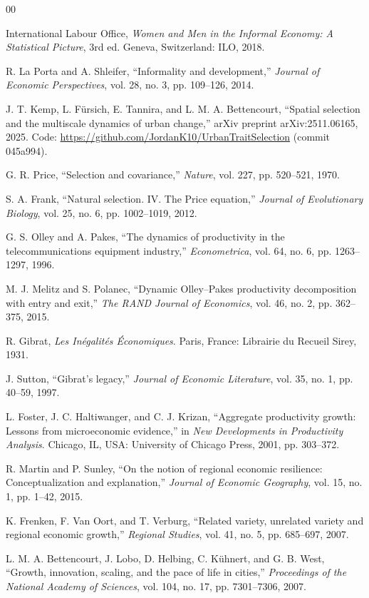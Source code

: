 \documentclass[conference]{IEEEtran}
\begin{document}
\begin{thebibliography}{00}

 International Labour Office, \textit{Women and Men in the
Informal Economy: A Statistical Picture}, 3rd ed. Geneva, Switzerland:
ILO, 2018.

 R. La Porta and A. Shleifer, ``Informality and
development,'' \textit{Journal of Economic Perspectives}, vol. 28, no. 3,
pp. 109--126, 2014.

 J. T. Kemp, L. F\"ursich, E. Tannira, and L. M. A.
Bettencourt, ``Spatial selection and the multiscale dynamics of urban
change,'' arXiv preprint arXiv:2511.06165, 2025. Code:
\url{https://github.com/JordanK10/UrbanTraitSelection} (commit 045a994).

 G. R. Price, ``Selection and covariance,''
\textit{Nature}, vol. 227, pp. 520--521, 1970.

 S. A. Frank, ``Natural selection. IV. The Price
equation,'' \textit{Journal of Evolutionary Biology}, vol. 25, no. 6, pp.
1002--1019, 2012.

 G. S. Olley and A. Pakes, ``The dynamics of
productivity in the telecommunications equipment industry,''
\textit{Econometrica}, vol. 64, no. 6, pp. 1263--1297, 1996.

 M. J. Melitz and S. Polanec, ``Dynamic Olley--Pakes
productivity decomposition with entry and exit,'' \textit{The RAND Journal
of Economics}, vol. 46, no. 2, pp. 362--375, 2015.

 R. Gibrat, \textit{Les In\'egalit\'es \'Economiques}.
Paris, France: Librairie du Recueil Sirey, 1931.

 J. Sutton, ``Gibrat's legacy,'' \textit{Journal of
Economic Literature}, vol. 35, no. 1, pp. 40--59, 1997.

 L. Foster, J. C. Haltiwanger, and C. J. Krizan,
``Aggregate productivity growth: Lessons from microeconomic evidence,''
in \textit{New Developments in Productivity Analysis}. Chicago, IL, USA:
University of Chicago Press, 2001, pp. 303--372.

 R. Martin and P. Sunley, ``On the notion of regional
economic resilience: Conceptualization and explanation,'' \textit{Journal
of Economic Geography}, vol. 15, no. 1, pp. 1--42, 2015.

 K. Frenken, F. Van Oort, and T. Verburg, ``Related
variety, unrelated variety and regional economic growth,'' \textit{Regional
Studies}, vol. 41, no. 5, pp. 685--697, 2007.

 L. M. A. Bettencourt, J. Lobo, D. Helbing, C.
K\"uhnert, and G. B. West, ``Growth, innovation, scaling, and the pace of
life in cities,'' \textit{Proceedings of the National Academy of Sciences},
vol. 104, no. 17, pp. 7301--7306, 2007.

\end{thebibliography}
\end{document}
